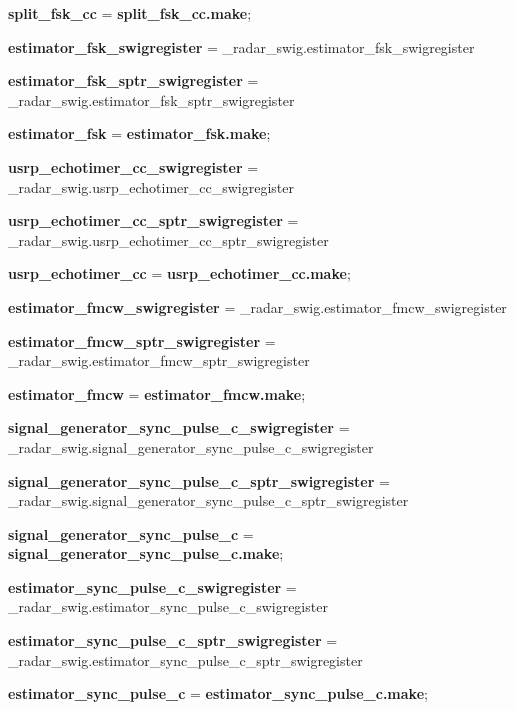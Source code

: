 \begin{DoxyCompactItemize}
\item 
{\bf split\+\_\+fsk\+\_\+cc} = {\bf split\+\_\+fsk\+\_\+cc.\+make};
\item 
{\bf estimator\+\_\+fsk\+\_\+swigregister} = \+\_\+radar\+\_\+swig.\+estimator\+\_\+fsk\+\_\+swigregister
\item 
{\bf estimator\+\_\+fsk\+\_\+sptr\+\_\+swigregister} = \+\_\+radar\+\_\+swig.\+estimator\+\_\+fsk\+\_\+sptr\+\_\+swigregister
\item 
{\bf estimator\+\_\+fsk} = {\bf estimator\+\_\+fsk.\+make};
\item 
{\bf usrp\+\_\+echotimer\+\_\+cc\+\_\+swigregister} = \+\_\+radar\+\_\+swig.\+usrp\+\_\+echotimer\+\_\+cc\+\_\+swigregister
\item 
{\bf usrp\+\_\+echotimer\+\_\+cc\+\_\+sptr\+\_\+swigregister} = \+\_\+radar\+\_\+swig.\+usrp\+\_\+echotimer\+\_\+cc\+\_\+sptr\+\_\+swigregister
\item 
{\bf usrp\+\_\+echotimer\+\_\+cc} = {\bf usrp\+\_\+echotimer\+\_\+cc.\+make};
\item 
{\bf estimator\+\_\+fmcw\+\_\+swigregister} = \+\_\+radar\+\_\+swig.\+estimator\+\_\+fmcw\+\_\+swigregister
\item 
{\bf estimator\+\_\+fmcw\+\_\+sptr\+\_\+swigregister} = \+\_\+radar\+\_\+swig.\+estimator\+\_\+fmcw\+\_\+sptr\+\_\+swigregister
\item 
{\bf estimator\+\_\+fmcw} = {\bf estimator\+\_\+fmcw.\+make};
\item 
{\bf signal\+\_\+generator\+\_\+sync\+\_\+pulse\+\_\+c\+\_\+swigregister} = \+\_\+radar\+\_\+swig.\+signal\+\_\+generator\+\_\+sync\+\_\+pulse\+\_\+c\+\_\+swigregister
\item 
{\bf signal\+\_\+generator\+\_\+sync\+\_\+pulse\+\_\+c\+\_\+sptr\+\_\+swigregister} = \+\_\+radar\+\_\+swig.\+signal\+\_\+generator\+\_\+sync\+\_\+pulse\+\_\+c\+\_\+sptr\+\_\+swigregister
\item 
{\bf signal\+\_\+generator\+\_\+sync\+\_\+pulse\+\_\+c} = {\bf signal\+\_\+generator\+\_\+sync\+\_\+pulse\+\_\+c.\+make};
\item 
{\bf estimator\+\_\+sync\+\_\+pulse\+\_\+c\+\_\+swigregister} = \+\_\+radar\+\_\+swig.\+estimator\+\_\+sync\+\_\+pulse\+\_\+c\+\_\+swigregister
\item 
{\bf estimator\+\_\+sync\+\_\+pulse\+\_\+c\+\_\+sptr\+\_\+swigregister} = \+\_\+radar\+\_\+swig.\+estimator\+\_\+sync\+\_\+pulse\+\_\+c\+\_\+sptr\+\_\+swigregister
\item 
{\bf estimator\+\_\+sync\+\_\+pulse\+\_\+c} = {\bf estimator\+\_\+sync\+\_\+pulse\+\_\+c.\+make};

\end{DoxyCompactItemize}
